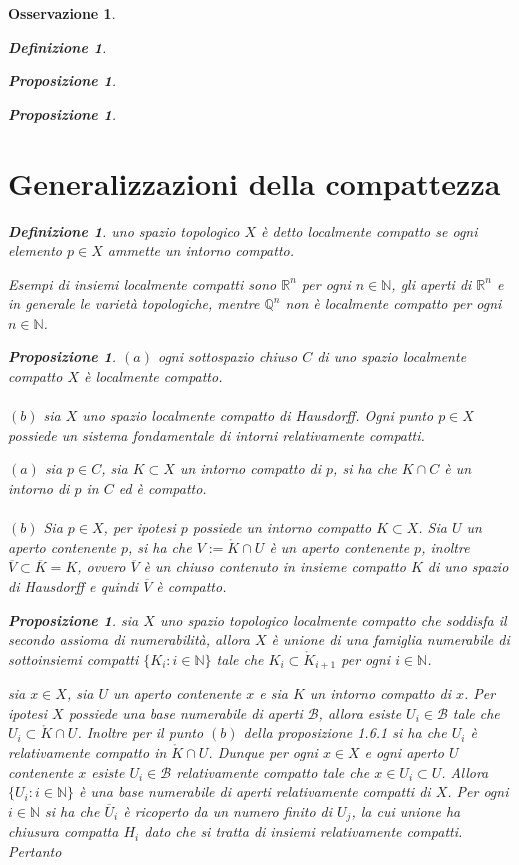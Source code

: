 \documentclass[oneside, 11pt]{amsbook}
\makeatletter
\newcommand{\0}{{(0)}}
\newcommand{\3}{{(3)}}
\theoremstyle{colonplain}
\newtheorem{prop}[thm]{Proposizione}
\theoremstyle{colondefinition}
\newtheorem{defn}[thm]{Definizione}
\theoremstyle{colonremark}
\newtheorem{rmk}[thm]{Osservazione}
\numberwithin{equation}{chapter}
\renewcommand{\proofname}{Dimostrazione}
\renewenvironment{proof}[1][\proofname]{\par
  \pushQED{\end{proof}}%
  \normalfont \topsep6\p@\@plus6\p@\relax
  \trivlist
  \item[\hskip\labelsep\bfseries #1:]\ignorespaces
}{%
  \popQED\endtrivlist\@endpefalse
}
\makeatother
\begin{document}
\begin{rmk}
\begin{defn}
\begin{prop}
\begin{prop}
\section{Generalizzazioni della compattezza}
\begin{defn}
uno spazio topologico $X$ è detto \textit{localmente compatto} se ogni elemento $p \in X$ ammette un intorno compatto.
\end{defn}
Esempi di insiemi localmente compatti sono $\mathbb{R}^n$ per ogni $n \in \mathbb{N}$, gli aperti di $\mathbb{R}^n$ e in generale le varietà topologiche, mentre $\mathbb{Q}^n$ non è localmente compatto per ogni $n \in \mathbb{N}$.
\begin{prop}
$(a)$ ogni sottospazio chiuso $C$ di uno spazio localmente compatto $X$ è localmente compatto. \\ \\
$(b)$ sia $X$ uno spazio localmente compatto di Hausdorff. Ogni punto $p \in X$ possiede un sistema fondamentale di intorni relativamente compatti.
\end{prop}
\begin{proof}
$(a)$ sia $p \in C$, sia $K \subset X$ un intorno compatto di $p$, si ha che $K \cap C$ è un intorno di $p$ in $C$ ed è compatto. \\ \\
$(b)$ Sia $p \in X$, per ipotesi $p$ possiede un intorno compatto $K \subset X$. Sia $U$ un aperto contenente $p$, si ha che $V := \mathring{K} \cap U$ è un aperto contenente $p$, inoltre $\overline{V} \subset \overline{K} = K$, ovvero $\overline{V}$ è un chiuso contenuto in insieme compatto $K$ di uno spazio di Hausdorff e quindi $\overline{V}$ è compatto.
\end{proof}
\begin{prop}
sia $X$ uno spazio topologico localmente compatto che soddisfa il secondo assioma di numerabilità, allora $X$ è unione di una famiglia numerabile di sottoinsiemi compatti $\{K_i : i \in \mathbb{N}\}$ tale che $K_i \subset \mathring{K}_{i + 1}$ per ogni $i \in \mathbb{N}$.
\end{prop}
\begin{proof}
sia $x \in X$, sia $U$ un aperto contenente $x$ e sia $K$ un intorno compatto di $x$. Per ipotesi $X$ possiede una base numerabile di aperti $\mathcal{B}$, allora esiste $U_i \in \mathcal{B}$ tale che $U_i \subset \mathring{K} \cap U$. Inoltre per il punto $(b)$ della \textit{proposizione 1.6.1} si ha che $U_i$ è relativamente compatto in $\mathring{K} \cap U$. Dunque per ogni $x \in X$ e ogni aperto $U$ contenente $x$ esiste $U_i \in \mathcal{B}$ relativamente compatto tale che $x \in U_i \subset U$. Allora $\{U_i : i \in \mathbb{N}\}$ è una base numerabile di aperti relativamente compatti di $X$. Per ogni $i \in \mathbb{N}$ si ha che $\overline{U}_i$ è ricoperto da un numero finito di $U_j$, la cui unione ha chiusura compatta $H_i$ dato che si tratta di insiemi relativamente compatti. Pertanto

\end{proof}
\end{prop}
\end{prop}
\end{defn}
\end{rmk}
\end{document}
